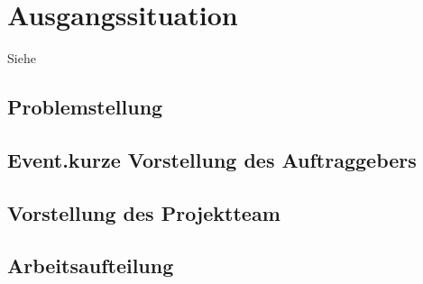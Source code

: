 \chapter{Ausgangssituation}
Siehe \cite{LitecHome}

\section{Problemstellung}
\section{Event.kurze Vorstellung des Auftraggebers}
\section{Vorstellung des Projektteam}
\section{Arbeitsaufteilung}